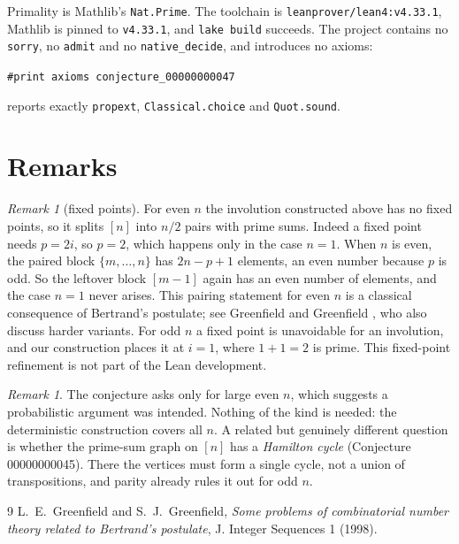 \documentclass[11pt]{article}
\theoremstyle{plain}
\theoremstyle{remark}
\newtheorem{remark}[theorem]{Remark}
\begin{document}
Primality is Mathlib's \texttt{Nat.Prime}. The toolchain is
\texttt{leanprover/lean4:v4.33.1}, Mathlib is pinned to \texttt{v4.33.1}, and
\texttt{lake build} succeeds. The project contains no \texttt{sorry}, no \texttt{admit} and no
\texttt{native\_decide}, and introduces no axioms:
\begin{center}
\texttt{\#print axioms conjecture\_00000000047}
\end{center}
reports exactly \texttt{propext}, \texttt{Classical.choice} and
\texttt{Quot.sound}.

\section{Remarks}

\begin{remark}[fixed points]
For even $n$ the involution constructed above has no fixed points, so it
splits $[n]$ into $n/2$ pairs with prime sums. Indeed a fixed point needs
$p=2i$, so $p=2$, which happens only in the case $n=1$. When $n$ is even, the
paired block $\{m,\ldots,n\}$ has $2n-p+1$ elements, an even number because $p$
is odd. So the leftover block $[m-1]$ again has an even number of elements, and
the case $n=1$ never arises. This pairing statement for even $n$ is a classical
consequence of Bertrand's postulate; see Greenfield and Greenfield
\cite{greenfield}, who also discuss harder variants. For odd $n$ a fixed point
is unavoidable for an involution, and our construction places it at $i=1$,
where $1+1=2$ is prime. This fixed-point refinement is not part of the Lean
development.
\end{remark}

\begin{remark}
The conjecture asks only for large even $n$, which suggests a probabilistic
argument was intended. Nothing of the kind is needed: the deterministic
construction covers all $n$. A related but genuinely different question is
whether the prime-sum graph on $[n]$ has a \emph{Hamilton cycle}
(Conjecture 00000000045). There the vertices must form a single cycle, not a
union of transpositions, and parity already rules it out for odd $n$.
\end{remark}

\begin{thebibliography}{9}
 L.~E.~Greenfield and S.~J.~Greenfield, \emph{Some
  problems of combinatorial number theory related to Bertrand's postulate},
  J. Integer Sequences 1 (1998).
\end{thebibliography}
\end{document}

